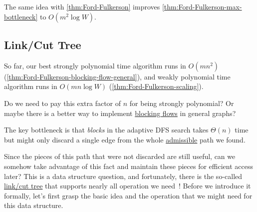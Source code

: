 \begin{remark}
	The same idea with \autoref{thm:Ford-Fulkerson} improves \autoref{thm:Ford-Fulkerson-max-bottleneck} to \(O(m^2 \log W)\).
\end{remark}

\subsection{Link/Cut Tree}
So far, our best strongly polynomial time algorithm runs in \(O(mn^2)\) (\autoref{thm:Ford-Fulkerson-blocking-flow-general}), and weakly polynomial time algorithm runs in \(O(mn \log W)\) (\autoref{thm:Ford-Fulkerson-scaling}).

\begin{problem*}
	Do we need to pay this extra factor of \(n\) for being strongly polynomial? Or maybe there is a better way to implement \hyperref[def:blocking-flow]{blocking flows} in general graphs?
\end{problem*}

\begin{prev}
	The key bottleneck is that \emph{blocks} in the adaptive DFS search takes \(\Theta (n)\) time but might only discard a single edge from the whole \hyperref[def:admissible]{admissible} path we found.
\end{prev}

Since the pieces of this path that were not discarded are still useful, can we somehow take advantage of this fact and maintain these pieces for efficient access later? This is a data structure question, and fortunately, there is the so-called \hyperref[def:link-cut-tree]{link/cut tree} that supports nearly all operation we need~\cite{sleator1981data}! Before we introduce it formally, let's first grasp the basic idea and the operation that we might need for this data structure.

